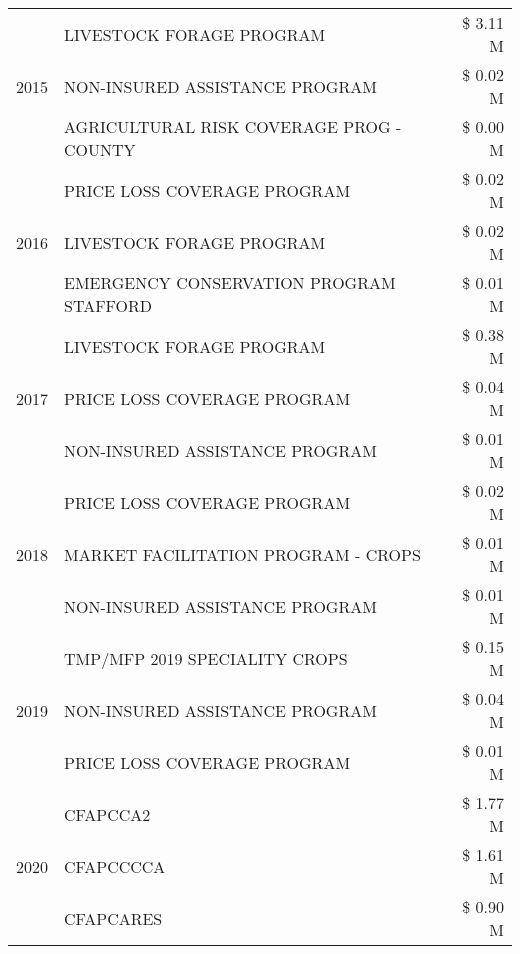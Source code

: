 \begin{tabular}{llr}
\cline{1-3}
\multirow[t]{3}{*}{2015} & LIVESTOCK FORAGE PROGRAM & \$ 3.11 M \\
 & NON-INSURED ASSISTANCE PROGRAM & \$ 0.02 M \\
 & AGRICULTURAL RISK COVERAGE PROG - COUNTY & \$ 0.00 M \\
\cline{1-3}
\multirow[t]{3}{*}{2016} & PRICE LOSS COVERAGE PROGRAM & \$ 0.02 M \\
 & LIVESTOCK FORAGE PROGRAM & \$ 0.02 M \\
 & EMERGENCY CONSERVATION PROGRAM STAFFORD & \$ 0.01 M \\
\cline{1-3}
\multirow[t]{3}{*}{2017} & LIVESTOCK FORAGE PROGRAM & \$ 0.38 M \\
 & PRICE LOSS COVERAGE PROGRAM & \$ 0.04 M \\
 & NON-INSURED ASSISTANCE PROGRAM & \$ 0.01 M \\
\cline{1-3}
\multirow[t]{3}{*}{2018} & PRICE LOSS COVERAGE PROGRAM & \$ 0.02 M \\
 & MARKET FACILITATION PROGRAM - CROPS & \$ 0.01 M \\
 & NON-INSURED ASSISTANCE PROGRAM & \$ 0.01 M \\
\cline{1-3}
\multirow[t]{3}{*}{2019} & TMP/MFP 2019 SPECIALITY CROPS & \$ 0.15 M \\
 & NON-INSURED ASSISTANCE PROGRAM & \$ 0.04 M \\
 & PRICE LOSS COVERAGE PROGRAM & \$ 0.01 M \\
\cline{1-3}
\multirow[t]{3}{*}{2020} & CFAPCCA2 & \$ 1.77 M \\
 & CFAPCCCCA & \$ 1.61 M \\
 & CFAPCARES & \$ 0.90 M \\
\cline{1-3}
\bottomrule
\end{tabular}
